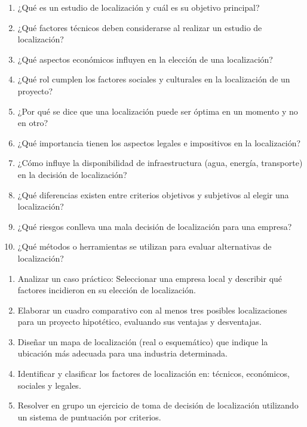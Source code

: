 \documentclass[../main]{subfiles}
\begin{document}
\begin{enumerate}
  \item ¿Qué es un estudio de localización y cuál es su objetivo principal?
  \item ¿Qué factores técnicos deben considerarse al realizar un
    estudio de localización?
  \item ¿Qué aspectos económicos influyen en la elección de una localización?
  \item ¿Qué rol cumplen los factores sociales y culturales en la
    localización de un proyecto?
  \item ¿Por qué se dice que una localización puede ser óptima en un
    momento y no en otro?
  \item ¿Qué importancia tienen los aspectos legales e impositivos en
    la localización?
  \item ¿Cómo influye la disponibilidad de infraestructura (agua,
    energía, transporte) en la decisión de localización?
  \item ¿Qué diferencias existen entre criterios objetivos y
    subjetivos al elegir una localización?
  \item ¿Qué riesgos conlleva una mala decisión de localización para
    una empresa?
  \item ¿Qué métodos o herramientas se utilizan para evaluar
    alternativas de localización?
\end{enumerate}
\begin{enumerate}
  \item Analizar un caso práctico: Seleccionar una empresa local y
    describir qué factores incidieron en su elección de localización.
  \item Elaborar un cuadro comparativo con al menos tres posibles
    localizaciones para un proyecto hipotético, evaluando sus
    ventajas y desventajas.
  \item Diseñar un mapa de localización (real o esquemático) que
    indique la ubicación más adecuada para una industria determinada.
  \item Identificar y clasificar los factores de localización en:
    técnicos, económicos, sociales y legales.
  \item Resolver en grupo un ejercicio de toma de decisión de
    localización utilizando un sistema de puntuación por criterios.
\end{enumerate}
\end{document}
